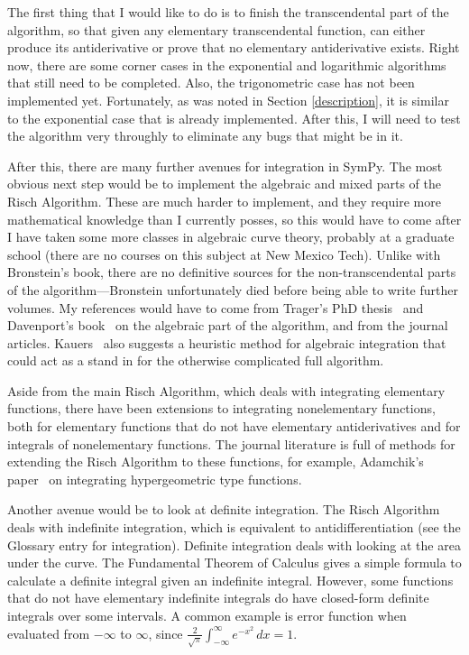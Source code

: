 The first thing that I would like to do is to finish the
\gls{transcendental} part of the algorithm, so that given any
\gls{elementary} \gls{transcendental} function, \rischintegrate{} can
either produce its antiderivative or prove that no \gls{elementary}
antiderivative exists.  Right now, there are some corner cases in the
exponential and logarithmic algorithms that still need to be completed. 
Also, the trigonometric case has not been implemented yet.  Fortunately,
as was noted in Section \ref{description}, it is similar to the
exponential case that is already implemented.  After this, I will need
to test the algorithm very throughly to eliminate any bugs that might be
in it.

After this, there are many further avenues for \gls{integration} in
SymPy.  The most obvious next step would be to implement the algebraic
and mixed parts of the Risch Algorithm.  These are much harder to
implement, and they require more mathematical knowledge than I currently
posses, so this would have to come after I have taken some more classes
in algebraic curve theory, probably at a graduate school (there are no
courses on this subject at New Mexico Tech).  Unlike with Bronstein's
book, there are no definitive sources for the non-\gls{transcendental}
parts of the algorithm---Bronstein unfortunately died before being able
to write further volumes.  My references would have to come
from Trager's PhD thesis~\cite{trager1984integration} and Davenport's
book~\cite{davenport1984integration} on the algebraic part of the
algorithm, and from the journal articles.  Kauers~\cite{kauers2008integration} also suggests a heuristic method for
\gls{algebraic} \gls{integration} that could act as a stand in for the
otherwise complicated full algorithm.

Aside from the main Risch Algorithm, which deals with integrating
\gls{elementary} functions, there have been extensions to integrating
nonelementary functions, both for \gls{elementary} functions that do not
have \gls{elementary} antiderivatives and for integrals of nonelementary
functions.  The journal literature is full of methods for extending the
Risch Algorithm to these functions, for example, Adamchik's paper~\cite{adamchik1990hypergeometric} on integrating hypergeometric type
functions.

Another avenue would be to look at definite \gls{integration}.  The
Risch Algorithm deals with indefinite \gls{integration}, which is
equivalent to antidifferentiation (see the Glossary entry for
\gls{integration}).  Definite \gls{integration} deals with looking at
the area under the curve.  The Fundamental Theorem of Calculus gives a
simple formula to calculate a definite integral given an indefinite
integral.  However, some functions that do not have \gls{elementary}
indefinite integrals do have closed-form definite integrals over some
intervals.  A common example is \gls{error function} when evaluated from
$-\infty$ to $\infty$, since
$\frac{2}{\sqrt{\pi}}\int_{-\infty}^\infty{e^{-x^2}\,dx}=1$.

